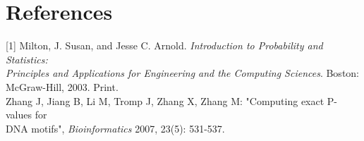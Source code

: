 \documentclass[12pt]{article}
\begin{document}
\pagebreak
\section{References}
[1] Milton, J. Susan, and Jesse C. Arnold. \textit{Introduction to Probability and Statistics: \\
\indent \indent Principles and Applications for Engineering and the Computing Sciences}. Boston: \\
\indent \indent McGraw-Hill, 2003. Print. \\

\noindent [2] Zhang J, Jiang B, Li M, Tromp J, Zhang X, Zhang M: "Computing exact P-values for \\
\indent \indent DNA motifs",  \textit{Bioinformatics} 2007, 23(5): 531-537. \\
\end{document}

